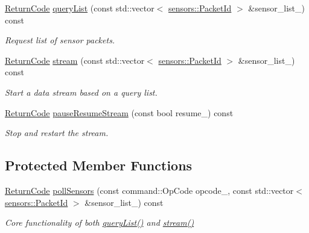\begin{DoxyCompactItemize}
\hyperlink{classroomba_1_1series500_1_1oi_1_1_o_i_encoder_ac2c8ad2f0306050926f89882d74696cc}{Return\+Code} \hyperlink{classroomba_1_1series500_1_1oi_1_1_o_i_encoder_a576852ce7ce8da29fd1e1088abc8c466}{query\+List} (const std\+::vector$<$ \hyperlink{namespaceroomba_1_1series500_1_1oi_1_1sensors_a909f47d40452d1cabb85eef642ac04b6}{sensors\+::\+Packet\+Id} $>$ \&sensor\+\_\+list\+\_\+) const 
\begin{DoxyCompactList}\small\item\em Request list of sensor packets. \end{DoxyCompactList}\item 
\hyperlink{classroomba_1_1series500_1_1oi_1_1_o_i_encoder_ac2c8ad2f0306050926f89882d74696cc}{Return\+Code} \hyperlink{classroomba_1_1series500_1_1oi_1_1_o_i_encoder_af0a440e4ed8b689a2ba9a8554f951e91}{stream} (const std\+::vector$<$ \hyperlink{namespaceroomba_1_1series500_1_1oi_1_1sensors_a909f47d40452d1cabb85eef642ac04b6}{sensors\+::\+Packet\+Id} $>$ \&sensor\+\_\+list\+\_\+) const 
\begin{DoxyCompactList}\small\item\em Start a data stream based on a query list. \end{DoxyCompactList}\item 
\hyperlink{classroomba_1_1series500_1_1oi_1_1_o_i_encoder_ac2c8ad2f0306050926f89882d74696cc}{Return\+Code} \hyperlink{classroomba_1_1series500_1_1oi_1_1_o_i_encoder_a7fa2db1885854427094d67cae5b29837}{pause\+Resume\+Stream} (const bool resume\+\_\+) const 
\begin{DoxyCompactList}\small\item\em Stop and restart the stream. \end{DoxyCompactList}\end{DoxyCompactItemize}
\subsection*{Protected Member Functions}
\begin{DoxyCompactItemize}
\item 
\hyperlink{classroomba_1_1series500_1_1oi_1_1_o_i_encoder_ac2c8ad2f0306050926f89882d74696cc}{Return\+Code} \hyperlink{classroomba_1_1series500_1_1oi_1_1_o_i_encoder_a268ff3f5446b14e595d0197d75499f20}{poll\+Sensors} (const command\+::\+Op\+Code opcode\+\_\+, const std\+::vector$<$ \hyperlink{namespaceroomba_1_1series500_1_1oi_1_1sensors_a909f47d40452d1cabb85eef642ac04b6}{sensors\+::\+Packet\+Id} $>$ \&sensor\+\_\+list\+\_\+) const 
\begin{DoxyCompactList}\small\item\em Core functionality of both \hyperlink{classroomba_1_1series500_1_1oi_1_1_o_i_encoder_a576852ce7ce8da29fd1e1088abc8c466}{query\+List()} and \hyperlink{classroomba_1_1series500_1_1oi_1_1_o_i_encoder_af0a440e4ed8b689a2ba9a8554f951e91}{stream()} \end{DoxyCompactList}\end{DoxyCompactItemize}
